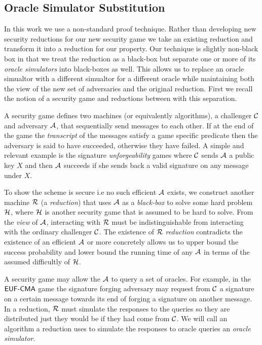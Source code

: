 

\subsection{Oracle Simulator Substitution}

In this work we use a non-standard proof technique.
Rather than developing new security reductions for our new security game we take an existing reduction and transform it into a reduction for our property.
Our technique is slightly non-black box in that we treat the reduction as a black-box but separate one or more of its \emph{oracle simulators} into black-boxes as well.
This allows us to replace an oracle simualtor with a different simualtor for a different oracle while maintaining both the view of the new set of adversaries and the original reduction.
First we recall the notion of a security game and reductions between with this separation.

A security game defines two machines (or equivalently algorithms), a challenger $\mathcal{C}$ and adversary $\mathcal{A}$, that sequentially send messages to each other.
If at the end of the game the \emph{transcript} of the messages satisfy a game specific predicate then the adversary is said to have succeeded, otherwise they have failed.
A simple and relevant example is the signature \emph{unforgeability} games where $\mathcal{C}$ sends $\mathcal{A}$ a public key $X$ and then $\mathcal{A}$ succeeds if she sends back a valid signature on any message under $X$.

To show the scheme is secure i.e no such efficient $\mathcal{A}$ exists, we construct another machine $\mathcal{R}$ (a \emph{reduction}) that uses $\mathcal{A}$ as a \emph{black-box} to solve some hard problem $\mathcal{H}$, where $\mathcal{H}$ is another security game that is assumed to be hard to solve.
From the \emph{view} of $\mathcal{A}$, interacting with $\mathcal{R}$ must be indistinguishable from interacting with the ordinary challenger $\mathcal{C}$.
The existence of $\mathcal{R}$ \emph{reduction} contradicts the existence of an efficient $\mathcal{A}$ or more concretely allows us to upper bound the success probability and lower bound the running time of any $\mathcal{A}$ in terms of the assumed difficultly of $\mathcal{H}$.

A security game may allow the $\mathcal{A}$ to query a set of oracles.
For example, in the $\textsf{EUF-CMA}$ game the signature forging adversary may request from $\mathcal{C}$ a signature on a certain message towards its end of forging a signature on another message.
In a reduction, $\mathcal{R}$ must simulate the responses to the queries so they are distributed just they would be if they had come from $\mathcal{C}$.
We will call an algorithm a reduction uses to simulate the responses to oracle queries an \emph{oracle simulator}.



